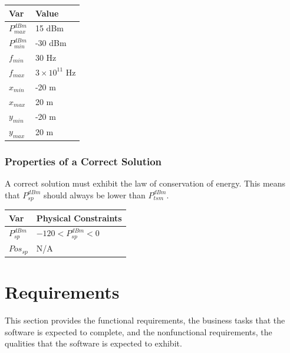 \documentclass[12pt]{article}
\begin{document}
\begin{table}[!h]
\caption{Specification Parameter Values} \label{TblSpecParams}
\renewcommand{\arraystretch}{1.2}
\noindent \begin{longtable*}{l l} 
  \toprule
  \textbf{Var} & \textbf{Value} \\
  \midrule 
  $P_{max}^{dBm}$ & 15 \si{dBm}\\
  $P_{min}^{dBm}$ & -30 \si{dBm}\\
  $f_{min}$ & 30 \si{\hertz}\\
  $f_{max}$ & $3\times 10^{11}$  \si{\hertz}\\
  $x_{min}$ & -20 \si{\meter}\\
  $x_{max}$ & 20 \si{\meter}\\
  $y_{min}$ & -20 \si{\meter}\\
  $y_{max}$ & 20 \si{\meter}\\
  \bottomrule
\end{longtable*}
\end{table}

\subsubsection{Properties of a Correct Solution} \label{sec_CorrectSolution}

\noindent
A correct solution must exhibit the law of conservation of energy. This means that
$P_{sp}^{dBm}$ should always be lower than $P_{tsm}^{dBm}$.

\begin{table}[!h]
\caption{Output Variables} \label{TblOutputVar}
\renewcommand{\arraystretch}{1.2}
\noindent \begin{longtable*}{l l} 
  \toprule
  \textbf{Var} & \textbf{Physical Constraints} \\
  \midrule 
  $P_{sp}^{dBm}$ & $-120 < P_{sp}^{dBm} < 0$ 
  \\
  $Pos_{sp}$ & N/A 
  \\
  \bottomrule
\end{longtable*}
\end{table}

\section{Requirements}

This section provides the functional requirements, the business tasks that the
software is expected to complete, and the nonfunctional requirements, the
qualities that the software is expected to exhibit.
\end{document}
